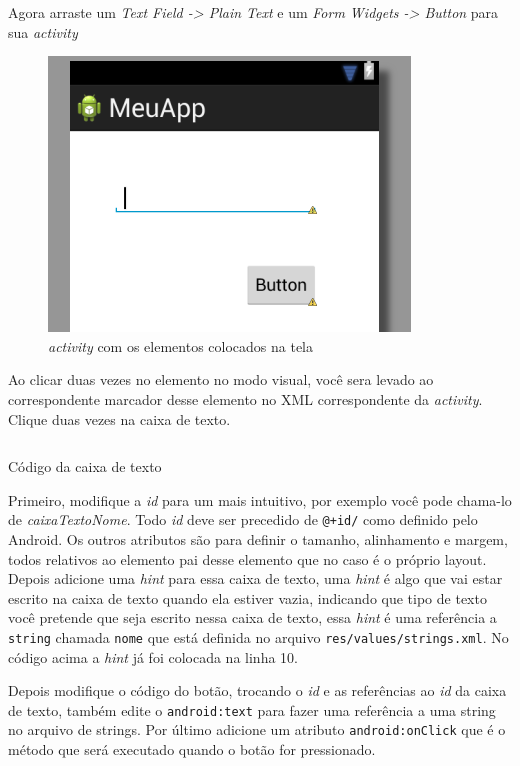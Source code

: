 \documentclass[a4paper,12pt,brazil,doubleside]{book}
\begin{document}
\begin{singlespace}
Agora arraste um \textit{Text Field -> Plain Text} e um \textit{Form Widgets -> Button} para sua \emph{activity} 

\begin{figure}[H]
  \centering
  \includegraphics{figuras/4-criando-app.png}
  \caption{\emph{activity} com os elementos colocados na tela}
  \label{fig:a}
\end{figure}

Ao clicar duas vezes no elemento no modo visual, você sera levado ao correspondente marcador desse elemento no XML correspondente da \emph{activity}. Clique duas vezes na caixa de texto.

\begin{listing}
\inputminted[linenos=true,fontsize=\small,frame=lines, framesep=2mm, tabsize=2,numbersep=5pt]{xml}{src/firstapp/1.xml}
\caption{Código da caixa de texto}
\end{listing}

Primeiro, modifique a \textit{id} para um mais intuitivo, por exemplo você pode chama-lo de \textit{caixaTextoNome}. Todo \textit{id} deve ser precedido de \texttt{@+id/} como definido pelo Android. Os outros atributos são para definir o tamanho, alinhamento e margem, todos relativos ao elemento pai desse elemento que no caso é o próprio layout. Depois adicione uma \textit{hint} para essa caixa de texto, uma \textit{hint} é algo que vai estar escrito na caixa de texto quando ela estiver vazia, indicando que tipo de texto você pretende que seja escrito nessa caixa de texto, essa \textit{hint} é uma referência a \texttt{string} chamada \texttt{nome} que está definida no arquivo \texttt{\textcolor{mygreen}{res/values/strings.xml}}.	 No código acima a \textit{hint} já foi colocada na linha 10.

Depois modifique o código do botão, trocando o \textit{id} e as referências ao \textit{id} da caixa de texto, também edite o \texttt{android:text} para fazer uma referência a uma string no arquivo de strings. Por último adicione um atributo \texttt{android:onClick} que é o método que será executado quando o botão for pressionado.


\end{singlespace}
\end{document}
